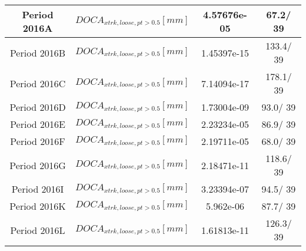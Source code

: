 \documentclass{article}
\begin{document}
\begin{longtable}{c|c|c|c}
\hline
 Period 2016A & $DOCA_{xtrk, loose, pt>0.5} [mm]$ & 4.57676e-05 &  67.2/ 39\\
\hline
 Period 2016B & $DOCA_{xtrk, loose, pt>0.5} [mm]$ & 1.45397e-15 & 133.4/ 39\\
\hline
 Period 2016C & $DOCA_{xtrk, loose, pt>0.5} [mm]$ & 7.14094e-17 & 178.1/ 39\\
\hline
 Period 2016D & $DOCA_{xtrk, loose, pt>0.5} [mm]$ & 1.73004e-09 &  93.0/ 39\\
\hline
 Period 2016E & $DOCA_{xtrk, loose, pt>0.5} [mm]$ & 2.23234e-05 &  86.9/ 39\\
\hline
 Period 2016F & $DOCA_{xtrk, loose, pt>0.5} [mm]$ & 2.19711e-05 &  68.0/ 39\\
\hline
 Period 2016G & $DOCA_{xtrk, loose, pt>0.5} [mm]$ & 2.18471e-11 & 118.6/ 39\\
\hline
 Period 2016I & $DOCA_{xtrk, loose, pt>0.5} [mm]$ & 3.23394e-07 &  94.5/ 39\\
\hline
 Period 2016K & $DOCA_{xtrk, loose, pt>0.5} [mm]$ & 5.962e-06 &  87.7/ 39\\
\hline
 Period 2016L & $DOCA_{xtrk, loose, pt>0.5} [mm]$ & 1.61813e-11 & 126.3/ 39\\
\hline
\end{longtable}
\end{document}
